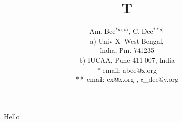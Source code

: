 \documentclass{revtex4}
\begin{document}
\title{T}
\author{
Ann Bee$^{*a),b)}$, C. Dee$^{**a)}$\\
a) Univ X, West Bengal,\\
India, Pin.-741235 \\
b) IUCAA, Pune 411 007, India \\
$*$  email: abee@x.org\\
$**$ email: cx@x.org
, c\_dee@y.org}
\maketitle
Hello.
\end{document}
